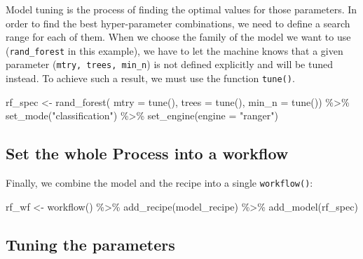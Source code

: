 \documentclass[
]{krantz}
\makeatletter
\newenvironment{Shaded}{\begin{snugshade}}{\end{snugshade}}
\newcommand{\AttributeTok}[1]{\textcolor[rgb]{0.61,0.61,0.61}{#1}}
\newcommand{\FunctionTok}[1]{\textcolor[rgb]{0,0,0}{#1}}
\newcommand{\NormalTok}[1]{#1}
\newcommand{\OtherTok}[1]{\textcolor[rgb]{0.37,0.37,0.37}{#1}}
\newcommand{\SpecialCharTok}[1]{\textcolor[rgb]{0,0,0}{#1}}
\newcommand{\StringTok}[1]{\textcolor[rgb]{0.5,0.5,0.5}{#1}}
\newenvironment{kframe}{%
\medskip{}
\setlength{\fboxsep}{.8em}
 \def\at@end@of@kframe{}%
 \ifinner\ifhmode%
  \def\at@end@of@kframe{\end{minipage}}%
  \begin{minipage}{\columnwidth}%
 \fi\fi%
 \def\FrameCommand##1{\hskip\@totalleftmargin \hskip-\fboxsep
 \colorbox{shadecolor}{##1}\hskip-\fboxsep
     \hskip-\linewidth \hskip-\@totalleftmargin \hskip\columnwidth}%
 \MakeFramed {\advance\hsize-\width
   \@totalleftmargin\z@ \linewidth\hsize
   \@setminipage}}%
 {\par\unskip\endMakeFramed%
 \at@end@of@kframe}
\renewenvironment{Shaded}{\begin{kframe}}{\end{kframe}}
\makeatother
\begin{document}
Model tuning is the process of finding the optimal values for those parameters. In order to find the best hyper-parameter combinations, we need to define a search range for each of them. When we choose the family of the model we want to use (\texttt{rand\_forest} in this example), we have to let the machine knows that a given parameter (\texttt{mtry,\ trees,\ min\_n}) is not defined explicitly and will be tuned instead. To achieve such a result, we must use the function \texttt{tune()}.

\begin{Shaded}
\begin{Highlighting}[]
\NormalTok{rf\_spec }\OtherTok{\textless{}{-}} \FunctionTok{rand\_forest}\NormalTok{(}
  \AttributeTok{mtry =} \FunctionTok{tune}\NormalTok{(),}
  \AttributeTok{trees =} \FunctionTok{tune}\NormalTok{(),}
  \AttributeTok{min\_n =} \FunctionTok{tune}\NormalTok{()) }\SpecialCharTok{\%\textgreater{}\%}
  \FunctionTok{set\_mode}\NormalTok{(}\StringTok{"classification"}\NormalTok{) }\SpecialCharTok{\%\textgreater{}\%} 
  \FunctionTok{set\_engine}\NormalTok{(}\AttributeTok{engine =} \StringTok{"ranger"}\NormalTok{)}
\end{Highlighting}
\end{Shaded}

\hypertarget{set-the-whole-process-into-a-workflow}{%
\subsection{Set the whole Process into a workflow}\label{set-the-whole-process-into-a-workflow}}

Finally, we combine the model and the recipe into a single \texttt{workflow()}:

\begin{Shaded}
\begin{Highlighting}[]
\NormalTok{rf\_wf }\OtherTok{\textless{}{-}} \FunctionTok{workflow}\NormalTok{() }\SpecialCharTok{\%\textgreater{}\%}
  \FunctionTok{add\_recipe}\NormalTok{(model\_recipe) }\SpecialCharTok{\%\textgreater{}\%} 
  \FunctionTok{add\_model}\NormalTok{(rf\_spec)}
\end{Highlighting}
\end{Shaded}

\hypertarget{tuning-the-parameters}{%
\subsection{Tuning the parameters}\label{tuning-the-parameters}}
\end{document}
